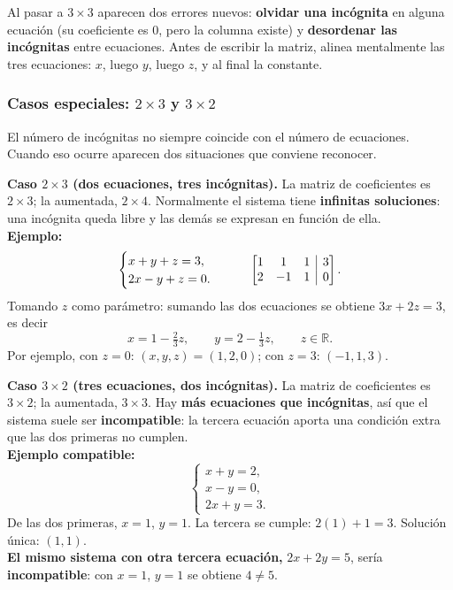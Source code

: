 \documentclass[12pt, letterpaper]{article}
\makeatletter
\newcommand{\mwaug}[2]{\ensuremath{\left[\begin{array}{@{}#1@{}}#2\end{array}\right]}}
\makeatother
\begin{document}
\begin{cuadroadvertencia}
  \small
  Al pasar a $3\times3$ aparecen dos errores nuevos: \textbf{olvidar una
  incógnita} en alguna ecuación (su coeficiente es $0$, pero la columna
  existe) y \textbf{desordenar las incógnitas} entre ecuaciones. Antes de
  escribir la matriz, alinea mentalmente las tres ecuaciones: $x$, luego $y$,
  luego $z$, y al final la constante.
\end{cuadroadvertencia}

\subsubsection*{Casos especiales: $2\times3$ y $3\times2$}

El número de incógnitas no siempre coincide con el número de ecuaciones.
Cuando eso ocurre aparecen dos situaciones que conviene reconocer.

\begin{cuadroteoria}
  \small
  \textbf{Caso $2\times3$ (dos ecuaciones, tres incógnitas).} La matriz de
  coeficientes es $2\times3$; la aumentada, $2\times4$. Normalmente el
  sistema tiene \textbf{infinitas soluciones}: una incógnita queda libre y
  las demás se expresan en función de ella.
  \\[4pt]
  \textbf{Ejemplo:}
  \[
    \begin{cases}
      x+y+z=3,\\
      2x-y+z=0.
    \end{cases}
    \qquad
    \mwaug{ccc|c}{1&1&1&3\\2&-1&1&0}.
  \]
  Tomando $z$ como parámetro: sumando las dos ecuaciones se obtiene
  $3x+2z=3$, es decir
  \[
    x=1-\tfrac{2}{3}z,
    \qquad
    y=2-\tfrac{1}{3}z,
    \qquad z\in\mathbb{R}.
  \]
  Por ejemplo, con $z=0$: $(x,y,z)=(1,2,0)$; con $z=3$: $(-1,1,3)$.
\end{cuadroteoria}

\begin{cuadroteoria}
  \small
  \textbf{Caso $3\times2$ (tres ecuaciones, dos incógnitas).} La matriz de
  coeficientes es $3\times2$; la aumentada, $3\times3$. Hay \textbf{más
  ecuaciones que incógnitas}, así que el sistema suele ser
  \textbf{incompatible}: la tercera ecuación aporta una condición extra que
  las dos primeras no cumplen.
  \\[4pt]
  \textbf{Ejemplo compatible:}
  \[
    \begin{cases}
      x+y=2,\\
      x-y=0,\\
      2x+y=3.
    \end{cases}
  \]
  De las dos primeras, $x=1$, $y=1$. La tercera se cumple: $2(1)+1=3$.
  Solución única: $(1,1)$.
  \\[4pt]
  \textbf{El mismo sistema con otra tercera ecuación,}
  $2x+2y=5$, sería \textbf{incompatible}: con $x=1$, $y=1$ se obtiene
  $4\neq5$.
\end{cuadroteoria}
\end{document}
